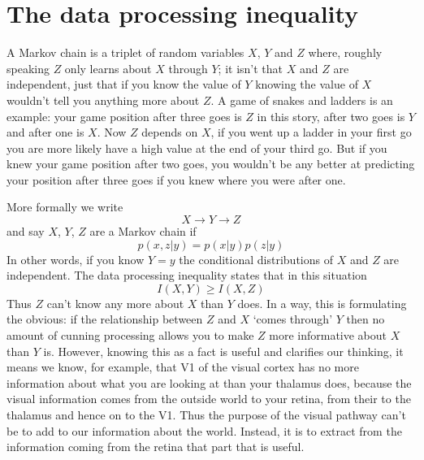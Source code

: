 \documentclass[12pt]{article}
\begin{document}
\section*{The data processing inequality}

A Markov chain is a triplet of random variables $X$, $Y$ and $Z$
where, roughly speaking $Z$ only learns about $X$ through $Y$; it isn't
that $X$ and $Z$ are independent, just that if you know the value of
$Y$ knowing the value of $X$ wouldn't tell you anything more about $Z$. A game of
snakes and ladders is an example: your game position after three goes
is $Z$ in this story, after two goes is $Y$ and after one is $X$. Now
$Z$ depends on $X$, if you went up a ladder in your first go you are
more likely have a high value at the end of your third go. But if you
knew your game position after two goes, you wouldn't be any better at
predicting your position after three goes if you knew where you were
after one.

More formally we write
\begin{equation}
X\rightarrow Y \rightarrow Z
\end{equation}
and say $X$, $Y$, $Z$ are a Markov chain if
\begin{equation}
p(x,z|y)=p(x|y)p(z|y)
\end{equation}
In other words, if you know $Y=y$ the conditional distributions of $X$
and $Z$ are independent. The data processing inequality states that in
this situation
\begin{equation}
I(X,Y)\ge I(X,Z)
\end{equation}
Thus $Z$ can't know any more about $X$ than $Y$ does. In a way, this
is formulating the obvious: if the relationship between $Z$ and $X$
\lq{}comes through\rq{} $Y$ then no amount of cunning processing
allows you to make $Z$ more informative about $X$ than $Y$
is. However, knowing this as a fact is useful and clarifies our
thinking, it means we know, for example, that V1 of the visual cortex
has no more information about what you are looking at than your
thalamus does, because the visual information comes from the outside
world to your retina, from their to the thalamus and hence on to the
V1. Thus the purpose of the visual pathway can't be to add to our
information about the world. Instead, it is to extract from the
information coming from the retina that part that is useful.


{}
\end{document}
